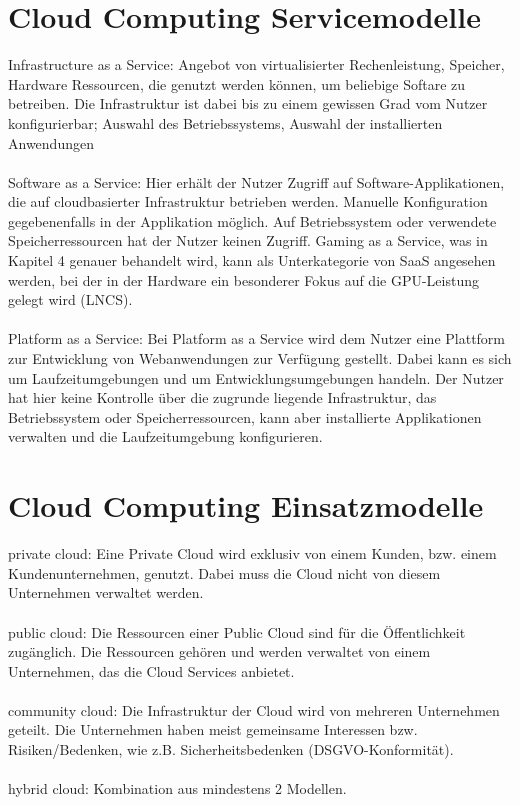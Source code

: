 \documentclass[12pt,toc=bib,toc=listof]{scrreprt}
\begin{document}
\section{Cloud Computing Servicemodelle} %
\label{sec:Cloud Computing Servicemodelle}

Infrastructure as a Service: Angebot von virtualisierter Rechenleistung, Speicher, Hardware Ressourcen, die genutzt werden können, um beliebige Softare zu betreiben.
Die Infrastruktur ist dabei bis zu einem gewissen Grad vom Nutzer konfigurierbar; Auswahl des Betriebssystems, Auswahl der installierten Anwendungen
\\ \\
Software as a Service: Hier erhält der Nutzer Zugriff auf Software-Applikationen, die auf cloudbasierter Infrastruktur betrieben werden.
Manuelle Konfiguration gegebenenfalls in der Applikation möglich. Auf Betriebssystem oder verwendete Speicherressourcen hat der Nutzer keinen Zugriff. 
Gaming as a Service, was in Kapitel 4 genauer behandelt wird, kann als Unterkategorie von SaaS angesehen werden, bei der in der Hardware ein besonderer Fokus auf die 
GPU-Leistung gelegt wird (LNCS).
\\ \\
Platform as a Service: Bei Platform as a Service wird dem Nutzer eine Plattform zur Entwicklung von Webanwendungen zur Verfügung gestellt. Dabei kann es sich 
um Laufzeitumgebungen und um Entwicklungsumgebungen handeln. Der Nutzer hat hier keine Kontrolle über die zugrunde liegende Infrastruktur, 
das Betriebssystem oder Speicherressourcen, kann aber installierte Applikationen verwalten und die Laufzeitumgebung konfigurieren.

\section{Cloud Computing Einsatzmodelle} %
\label{sec:Cloud Computing Einsatzmodelle}

private cloud: Eine Private Cloud wird exklusiv von einem Kunden, bzw. einem Kundenunternehmen, genutzt.
 Dabei muss die Cloud nicht von diesem Unternehmen verwaltet werden.
 \\ \\
public cloud: Die Ressourcen einer Public Cloud sind für die Öffentlichkeit zugänglich.
 Die Ressourcen gehören und werden verwaltet von einem Unternehmen, das die Cloud Services anbietet.
 \\ \\ 
community cloud: Die Infrastruktur der Cloud wird von mehreren Unternehmen geteilt.
 Die Unternehmen haben meist gemeinsame Interessen bzw. Risiken/Bedenken, wie z.B. Sicherheitsbedenken
  (DSGVO-Konformität).  
\\ \\  
hybrid cloud: Kombination aus mindestens 2 Modellen.
\end{document}
